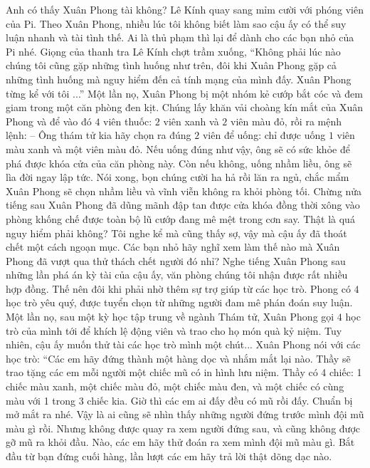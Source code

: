 	\vskip 0.1cm
	Anh có thấy Xuân Phong tài không? Lê Kính quay sang mỉm cười với phóng viên của Pi. Theo Xuân Phong, nhiều lúc tôi không biết làm sao cậu ấy có thể suy luận nhanh và tài tình thế. Ai là thủ phạm thì lại để dành cho các bạn nhỏ của Pi nhé.
	\vskip 0.1cm
	Giọng của thanh tra Lê Kính chợt trầm xuống, “Không phải lúc nào chúng tôi cũng gặp những tình huống như trên, đôi khi Xuân Phong gặp cả những tình huống mà nguy hiểm đến cả tính mạng của mình đấy. Xuân Phong từng kể với tôi ...”
	\vskip 0.1cm
	{\color{red}{THỬ THÁCH SỐNG CÒN}}
	\vskip 0.1cm 
	Một lần nọ, Xuân Phong bị một nhóm kẻ cướp bắt cóc và đem giam trong một căn phòng đen kịt. Chúng lấy khăn vải choàng kín mắt của Xuân Phong và để vào đó $4$ viên thuốc: $2$ viên xanh và $2$ viên màu đỏ, rồi ra mệnh lệnh:
	\vskip 0.1cm
	--	Ông thám tử kia hãy chọn ra đúng $2$ viên để uống: chỉ được uống $1$ viên màu xanh và một viên màu đỏ. Nếu uống đúng như vậy, ông sẽ có sức khỏe để phá được khóa cửa của căn phòng này. Còn nếu không, uống nhầm liều, ông sẽ lìa đời ngay lập tức. 
	\vskip 0.1cm
	Nói xong, bọn chúng cười ha hả rồi lăn ra ngủ, chắc mẩm Xuân Phong sẽ chọn nhầm liều và vĩnh viễn không ra khỏi phòng tối. Chừng nửa tiếng sau Xuân Phong đã dũng mãnh đập tan được cửa khóa đồng thời xông vào phòng khống chế được toàn bộ lũ cướp đang mê mệt trong cơn say. 
	\vskip 0.1cm
	Thật là quá nguy hiểm phải không? Tôi nghe kể mà cũng thấy sợ, vậy mà cậu ấy đã thoát chết một cách ngoạn mục. Các bạn nhỏ hãy nghĩ xem làm thế nào mà Xuân Phong đã vượt qua thử thách chết người đó nhỉ? 
	\vskip 0.1cm
	Nghe tiếng Xuân Phong sau những lần phá án kỳ tài của cậu ấy, văn phòng chúng tôi nhận được rất nhiều hợp đồng. Thế nên đôi khi phải nhờ thêm sự trợ giúp từ các học trò. Phong có $4$ học trò yêu quý, được tuyển chọn từ những người đam mê phán đoán suy luận. Một lần nọ, sau một kỳ học tập trung về ngành Thám tử, Xuân Phong gọi $4$ học trò của mình tới để khích lệ động viên và trao cho họ món quà kỷ niệm. Tuy nhiên, cậu ấy muốn thử tài các học trò mình một chút...
	\vskip 0.1cm
	{\color{red}{CHIẾC MŨ KỶ NIỆM}}
	\vskip 0.1cm
	Xuân Phong nói với các học trò: “Các em hãy đứng thành một hàng dọc và nhắm mắt lại nào. Thầy sẽ trao tặng các em mỗi người một chiếc mũ có in hình lưu niệm. Thầy có 4 chiếc: 1 chiếc màu xanh, một chiếc màu đỏ, một chiếc màu đen, và một chiếc có cùng màu với 1 trong 3 chiếc kia. Giờ thì các em ai đấy đều có mũ rồi đấy. Chuẩn bị mở mắt ra nhé. Vậy là ai cũng sẽ nhìn thấy những người đứng trước mình đội mũ màu gì rồi. Nhưng không được quay ra xem người đứng sau, và cũng không được gỡ mũ ra khỏi đầu. Nào, các em hãy thử đoán ra xem mình đội mũ màu gì. Bắt đầu từ bạn đứng cuối hàng, lần lượt các em hãy trả lời thật dõng dạc nào. 
